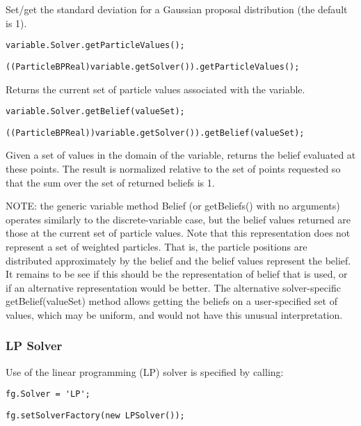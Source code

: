 Set/get the standard deviation for a Gaussian proposal distribution (the default is 1).

\ifmatlab
\begin{lstlisting}
variable.Solver.getParticleValues();
\end{lstlisting}
\fi

\ifjava
\begin{lstlisting}
((ParticleBPReal)variable.getSolver()).getParticleValues();
\end{lstlisting}
\fi

Returns the current set of particle values associated with the variable.

\ifmatlab
\begin{lstlisting}
variable.Solver.getBelief(valueSet);
\end{lstlisting}
\fi

\ifjava
\begin{lstlisting}
((ParticleBPReal))variable.getSolver()).getBelief(valueSet);
\end{lstlisting}
\fi

Given a set of values in the domain of the variable, returns the belief evaluated at these points. The result is normalized relative to the set of points requested so that the sum over the set of returned beliefs is 1.

NOTE: the generic variable method Belief (or getBeliefs() with no arguments) operates similarly to the discrete-variable case, but the belief values returned are those at the current set of particle values. Note that this representation does not represent a set of weighted particles. That is, the particle positions are distributed approximately by the belief and the belief values represent the belief. It remains to be see if this should be the representation of belief that is used, or if an alternative representation would be better. The alternative solver-specific getBelief(valueSet) method allows getting the beliefs on a user-specified set of values, which may be uniform, and would not have this unusual interpretation.


\clearpage
\subsubsection{LP Solver}
\label{sec:LPSolver}

Use of the linear programming (LP) solver is specified by calling:

\ifmatlab
\begin{lstlisting}
fg.Solver = 'LP';
\end{lstlisting}
\fi
\ifjava
\begin{lstlisting}
fg.setSolverFactory(new LPSolver());
\end{lstlisting}
\fi

